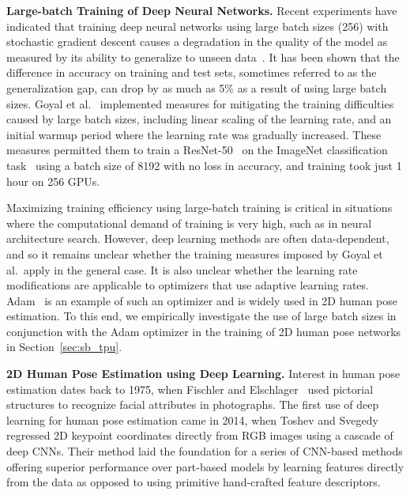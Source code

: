 \documentclass[final]{cvpr}
\begin{document}
\medskip\noindent\textbf{Large-batch Training of Deep Neural Networks.} Recent experiments have indicated that training deep neural networks using large batch sizes (256) with stochastic gradient descent causes a degradation in the quality of the model as measured by its ability to generalize to unseen data~\cite{hoffer2017train, keskar2016large}. It has been shown that the difference in accuracy on training and test sets, sometimes referred to as the generalization gap, can drop by as much as 5\% as a result of using large batch sizes. Goyal et al.\ \cite{goyal2017accurate} implemented measures for mitigating the training difficulties caused by large batch sizes, including linear scaling of the learning rate, and an initial warmup period where the learning rate was gradually increased. These measures permitted them to train a ResNet-50~\cite{he2016deep} on the ImageNet classification task~\cite{krizhevsky2012imagenet} using a batch size of 8192 with no loss in accuracy, and training took just 1 hour on 256 GPUs. 



Maximizing training efficiency using large-batch training is critical in situations where the computational demand of training is very high, such as in neural architecture search. However, deep learning methods are often data-dependent, and so it remains unclear whether the training measures imposed by Goyal et al.\ apply in the general case. It is also unclear whether the learning rate modifications are applicable to optimizers that use adaptive learning rates. Adam~\cite{kingma2014adam} is an example of such an optimizer and is widely used in 2D human pose estimation. To this end, we empirically investigate the use of large batch sizes in conjunction with the Adam optimizer in the training of 2D human pose networks in Section~\ref{sec:sb_tpu}.

\medskip\noindent\textbf{2D Human Pose Estimation using Deep Learning.} Interest in human pose estimation dates back to 1975, when Fischler and Elschlager~\cite{fischler1973representation} used pictorial structures to recognize facial attributes in photographs. The first use of deep learning for human pose estimation came in 2014, when Toshev and Svegedy~\cite{toshev2014deeppose} regressed 2D keypoint coordinates directly from RGB images using a cascade of deep CNNs. Their method laid the foundation for a series of CNN-based methods offering superior performance over part-based models by learning features directly from the data as opposed to using primitive hand-crafted feature descriptors.
\end{document}
